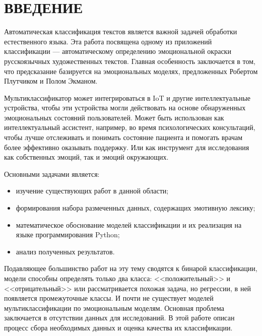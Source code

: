 \chapter*{ВВЕДЕНИЕ}
\vspace*{-0.5cm}


Автоматическая классификация текстов является важной задачей обработки естественного языка. Эта работа посвящена одному из приложений классификации --- автоматическому определению эмоциональной окраски русскоязычных художественных текстов. Главная особенность заключается в том, что предсказание базируется на эмоциональных моделях, предложенных Робертом Плутчиком и Полом Экманом.

\bigskip
Мультиклассификатор может интегрироваться в IoT и другие интеллектуальные устройства, чтобы эти устройства могли действовать на основе обнаруженных эмоциональных состояний пользователей. Может быть использован как интеллектуальный ассистент, например, во время психологических консультаций, чтобы лучше отслеживать и понимать состояние пациента и помогать врачам более эффективно оказывать поддержку. Или как инструмент для исследования как собственных эмоций, так и эмоций окружающих.

\bigskip\noindent
Основными задачами является:

\begin{itemize}
 \item изучение существующих работ в данной области;
 \item формирования набора размеченных данных, содержащих эмотивную лексику;
 \item математическое обоснование моделей классификации и их реализация на языке программирования Python;
 \item анализ полученных результатов.
\end{itemize}

\bigskip
Подавляющее большинство работ на эту тему сводятся к бинарой классификации, модели способны определять только два класса: <<положительный>> и <<отрицательный>> или рассматривается похожая задача, но регрессии, в ней появляется промежуточные классы. И почти не существует моделей мультиклассификации по эмоциональным моделям. Основная проблема заключается в отсутствии данных для исследований. В этой работе описан процесс сбора необходимых данных и оценка качества их классификации.

